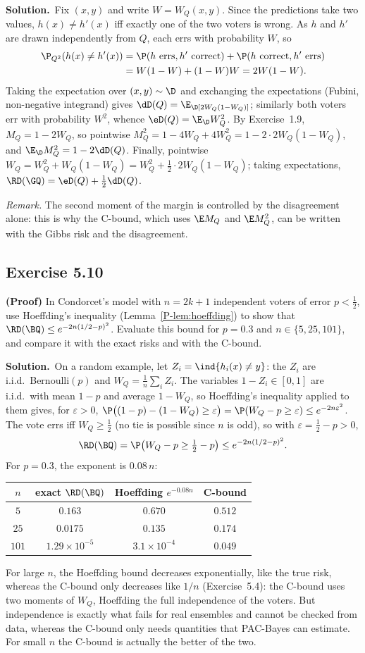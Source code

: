 \documentclass[11pt]{article}
\newcommand{\statement}[1]{\begin{tcolorbox}[enhanced,breakable,colback=black!3,colframe=black!25,boxrule=0.4pt,sharp corners,fontupper=\itshape\small]#1\end{tcolorbox}}
\newcommand{\exo}[1]{\Needspace{6\baselineskip}\subsection*{Exercise #1}\addcontentsline{toc}{subsection}{Exercise #1}}
\newcommand{\sol}{\noindent\textbf{Solution.}\ }
\begin{document}
\sol Fix $(x,y)$ and write $W=W_Q(x,y)$. Since the predictions take two values, $h(x)\neq h'(x)$ iff exactly one of the two voters
is wrong. As $h$ and $h'$ are drawn independently from $Q$, each errs with probability $W$, so
\begin{align*}
\P_{Q^2}(h(x)\neq h'(x))&=\P(h\text{ errs},h'\text{ correct})+\P(h\text{ correct},h'\text{ errs})\\
&=W(1-W)+(1-W)W=2W(1-W).
\end{align*}
Taking the expectation over $(x,y)\sim\D$ and exchanging the expectations (Fubini, non-negative integrand) gives
$\dD(Q)=\E_\D[2W_Q(1-W_Q)]$; similarly both voters err with probability $W^2$, whence $\eD(Q)=\E_\D W_Q^2$. By Exercise~1.9, $M_Q=1-2W_Q$,
so pointwise $M_Q^2=1-4W_Q+4W_Q^2=1-2\cdot2W_Q(1-W_Q)$, and $\E_\D M_Q^2=1-2\dD(Q)$. Finally, pointwise
$W_Q=W_Q^2+W_Q(1-W_Q)=W_Q^2+\frac12\cdot2W_Q(1-W_Q)$; taking expectations, $\RD(\GQ)=\eD(Q)+\frac12\dD(Q)$.

\emph{Remark.} The second moment of the margin is controlled by the disagreement alone: this is why the C-bound, which
uses $\E M_Q$ and $\E M_Q^2$, can be written with the Gibbs risk and the disagreement.

\exo{5.10}
\statement{\textbf{(Proof)} In Condorcet's model with $n=2k+1$ independent voters of error $p<\frac12$, use Hoeffding's inequality
(Lemma~\ref{P-lem:hoeffding}) to show that $\RD(\BQ)\leq e^{-2n(1/2-p)^2}$. Evaluate this bound for $p=0.3$ and $n\in\{5,25,101\}$, and compare it
with the exact risks and with the C-bound.}

\sol On a random example, let $Z_i=\ind{h_i(x)\neq y}$: the $Z_i$ are i.i.d.\ Bernoulli$(p)$ and $W_Q=\frac1n\sum_iZ_i$. The variables
$1-Z_i\in[0,1]$ are i.i.d.\ with mean $1-p$ and average $1-W_Q$, so Hoeffding's inequality applied to them gives, for $\varepsilon>0$,
$\P\big((1-p)-(1-W_Q)\geq\varepsilon\big)=\P(W_Q-p\geq\varepsilon)\leq e^{-2n\varepsilon^2}$. The vote errs iff $W_Q\geq\frac12$ (no tie is possible since $n$ is odd),
so with $\varepsilon=\frac12-p>0$,
\[
\RD(\BQ)=\P\big(W_Q-p\geq\tfrac12-p\big)\leq e^{-2n(1/2-p)^2}.
\]
For $p=0.3$, the exponent is $0.08\,n$:
\begin{center}\small
\begin{tabular}{cccc}
\toprule
$n$ & exact $\RD(\BQ)$ & Hoeffding $e^{-0.08n}$ & C-bound \\
\midrule
$5$ & $0.163$ & $0.670$ & $0.512$ \\
$25$ & $0.0175$ & $0.135$ & $0.174$ \\
$101$ & $1.29\times10^{-5}$ & $3.1\times10^{-4}$ & $0.049$ \\
\bottomrule
\end{tabular}
\end{center}
For large $n$, the Hoeffding bound decreases exponentially, like the true risk, whereas the C-bound only decreases like
$1/n$ (Exercise~5.4): the C-bound uses two moments of $W_Q$, Hoeffding the full independence of the voters. But independence
is exactly what fails for real ensembles and cannot be checked from data, whereas the C-bound only needs quantities that
PAC-Bayes can estimate. For small $n$ the C-bound is actually the better of the two.
\end{document}
